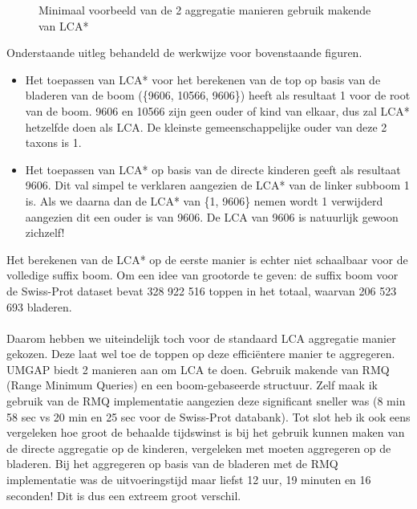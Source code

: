 \begin{figure}[H]
    \centering
    \hspace{0.25\textwidth}%
    \caption{Minimaal voorbeeld van de 2 aggregatie manieren gebruik makende van LCA*}\label{fig:lca*_diff}
\end{figure}

Onderstaande uitleg behandeld de werkwijze voor bovenstaande figuren.
\begin{itemize}
    \item Het toepassen van LCA* voor het berekenen van de top op basis van de bladeren van de boom (\{9606, 10566, 9606\}) heeft als resultaat 1 voor de root van de boom.
    9606 en 10566 zijn geen ouder of kind van elkaar, dus zal LCA* hetzelfde doen als LCA\@.
    De kleinste gemeenschappelijke ouder van deze 2 taxons is 1.
    \item Het toepassen van LCA* op basis van de directe kinderen geeft als resultaat 9606.
    Dit val simpel te verklaren aangezien de LCA* van de linker subboom 1 is.
    Als we daarna dan de LCA* van \{1, 9606\} nemen wordt 1 verwijderd aangezien dit een ouder is van 9606.
    De LCA van 9606 is natuurlijk gewoon zichzelf!
\end{itemize}

Het berekenen van de LCA* op de eerste manier is echter niet schaalbaar voor de volledige suffix boom.
Om een idee van grootorde te geven: de suffix boom voor de Swiss-Prot dataset bevat 328 922 516 toppen in het totaal, waarvan 206 523 693 bladeren.
\\ \\
Daarom hebben we uiteindelijk toch voor de standaard LCA aggregatie manier gekozen.
Deze laat wel toe de toppen op deze efficiëntere manier te aggregeren.
UMGAP biedt 2 manieren aan om LCA te doen.
Gebruik makende van RMQ (Range Minimum Queries) en een boom-gebaseerde structuur.
Zelf maak ik gebruik van de RMQ implementatie aangezien deze significant sneller was (8 min 58 sec vs 20 min en 25 sec voor de Swiss-Prot databank).
Tot slot heb ik ook eens vergeleken hoe groot de behaalde tijdswinst is bij het gebruik kunnen maken van de directe aggregatie op de kinderen, vergeleken met moeten aggregeren op de bladeren.
Bij het aggregeren op basis van de bladeren met de RMQ implementatie was de uitvoeringstijd maar liefst 12 uur, 19 minuten en 16 seconden!
Dit is dus een extreem groot verschil.

